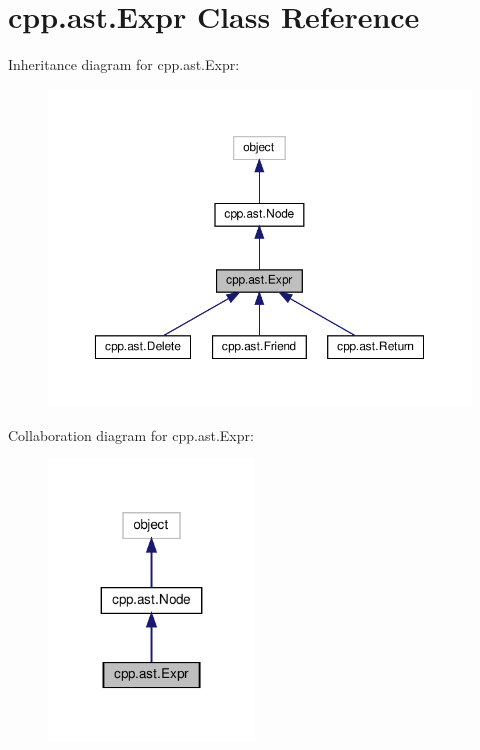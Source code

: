 \hypertarget{classcpp_1_1ast_1_1_expr}{}\section{cpp.\+ast.\+Expr Class Reference}
\label{classcpp_1_1ast_1_1_expr}


Inheritance diagram for cpp.\+ast.\+Expr\+:
\nopagebreak
\begin{figure}[H]
\begin{center}
\leavevmode
\includegraphics[width=350pt]{classcpp_1_1ast_1_1_expr__inherit__graph}
\end{center}
\end{figure}


Collaboration diagram for cpp.\+ast.\+Expr\+:
\nopagebreak
\begin{figure}[H]
\begin{center}
\leavevmode
\includegraphics[width=155pt]{classcpp_1_1ast_1_1_expr__coll__graph}
\end{center}
\end{figure}
